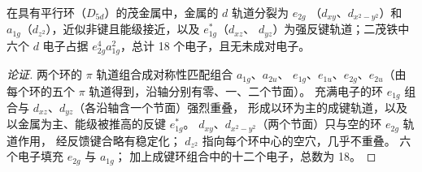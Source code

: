 \begin{proposition}[二茂铁的前线轨道]\label{prop:b3:organometallic-bonding:ferrocene}
在具有平行环（$D_{5d}$）的茂金属中，金属的 $d$ 轨道分裂为 $e_{2g}$
（$d_{xy}$、$d_{x^2-y^2}$）和 $a_{1g}$（$d_{z^2}$），近似非键且能级接近，以及 $e_{1g}^\ast$（$d_{xz}$、
$d_{yz}$）为强反键轨道；二茂铁中六个 $d$ 电子占据 $e_{2g}^4a_{1g}^2$，总计 18
个电子，且无未成对电子。
\end{proposition}

\begin{proof}[论证]
两个环的 $\pi$ 轨道组合成对称性匹配组合 $a_{1g}$、$a_{2u}$、
$e_{1g}$、$e_{1u}$、$e_{2g}$、$e_{2u}$（由每个环的五个 $\pi$ 轨道得到，沿轴分别有零、一、二个节面）。
充满电子的环 $e_{1g}$ 组合与 $d_{xz}$、$d_{yz}$（各沿轴含一个节面）强烈重叠，
形成以环为主的成键轨道，以及以金属为主、能级被推高的反键 $e_{1g}^\ast$。
$d_{xy}$、$d_{x^2-y^2}$（两个节面）只与空的环 $e_{2g}$ 轨道作用，
经反馈键合略有稳定化；
$d_{z^2}$ 指向每个环中心的空穴，几乎不重叠。
六个电子填充 $e_{2g}$ 与 $a_{1g}$；
加上成键环组合中的十二个电子，总数为 18。
\end{proof}


